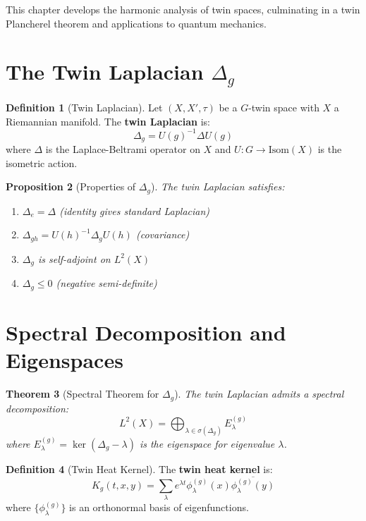 \documentclass[11pt,a4paper,openright]{book}
\theoremstyle{plain}
\newtheorem{theorem}{Theorem}[chapter]
\newtheorem{proposition}[theorem]{Proposition}
\theoremstyle{definition}
\newtheorem{definition}[theorem]{Definition}
\begin{document}
This chapter develops the harmonic analysis of twin spaces, culminating in a twin Plancherel theorem and applications to quantum mechanics.

\section{The Twin Laplacian $\Delta_g$}

\begin{definition}[Twin Laplacian]
Let $(X, X', \tau)$ be a $G$-twin space with $X$ a Riemannian manifold. The \textbf{twin Laplacian} is:
\begin{equation}
\Delta_g = U(g)^{-1} \Delta U(g)
\end{equation}
where $\Delta$ is the Laplace-Beltrami operator on $X$ and $U: G \to \mathrm{Isom}(X)$ is the isometric action.
\end{definition}

\begin{proposition}[Properties of $\Delta_g$]
The twin Laplacian satisfies:
\begin{enumerate}[label=(\roman*)]
    \item $\Delta_e = \Delta$ (identity gives standard Laplacian)
    \item $\Delta_{gh} = U(h)^{-1} \Delta_g U(h)$ (covariance)
    \item $\Delta_g$ is self-adjoint on $L^2(X)$
    \item $\Delta_g \leq 0$ (negative semi-definite)
\end{enumerate}
\end{proposition}

\section{Spectral Decomposition and Eigenspaces}

\begin{theorem}[Spectral Theorem for $\Delta_g$]
The twin Laplacian admits a spectral decomposition:
\begin{equation}
L^2(X) = \bigoplus_{\lambda \in \sigma(\Delta_g)} E_\lambda^{(g)}
\end{equation}
where $E_\lambda^{(g)} = \ker(\Delta_g - \lambda)$ is the eigenspace for eigenvalue $\lambda$.
\end{theorem}

\begin{definition}[Twin Heat Kernel]
The \textbf{twin heat kernel} is:
\begin{equation}
K_g(t, x, y) = \sum_{\lambda} e^{\lambda t} \phi_\lambda^{(g)}(x) \overline{\phi_\lambda^{(g)}(y)}
\end{equation}
where $\{\phi_\lambda^{(g)}\}$ is an orthonormal basis of eigenfunctions.
\end{definition}
\end{document}
